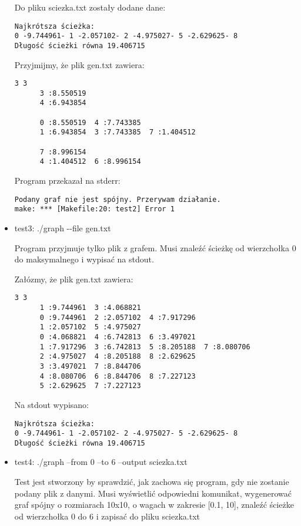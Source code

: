 \documentclass[]{article}
\begin{document}
\begin{itemize}
Do pliku sciezka.txt zostały dodane dane:
\begin{verbatim}
Najkrótsza ścieżka:
0 -9.744961- 1 -2.057102- 2 -4.975027- 5 -2.629625- 8
Długość ścieżki równa 19.406715
\end{verbatim}

Przyjmijmy, że plik gen.txt zawiera:
\begin{verbatim}
3 3
	  3 :8.550519
	  4 :6.943854

	  0 :8.550519  4 :7.743385
	  1 :6.943854  3 :7.743385  7 :1.404512

	  7 :8.996154
	  4 :1.404512  6 :8.996154

\end{verbatim}

Program przekazał na stderr:
\begin{verbatim}
Podany graf nie jest spójny. Przerywam działanie.
make: *** [Makefile:20: test2] Error 1
\end{verbatim}
\item test3: ./graph -{}-file gen.txt

Program przyjmuje tylko plik z grafem. Musi znaleźć ścieżkę od wierzchołka 0 do maksymalnego i wypisać na stdout.

Załózmy, że plik gen.txt zawiera:
\begin{verbatim}
3 3
	  1 :9.744961  3 :4.068821
	  0 :9.744961  2 :2.057102  4 :7.917296
	  1 :2.057102  5 :4.975027
	  0 :4.068821  4 :6.742813  6 :3.497021
	  1 :7.917296  3 :6.742813  5 :8.205188  7 :8.080706
	  2 :4.975027  4 :8.205188  8 :2.629625
	  3 :3.497021  7 :8.844706
	  4 :8.080706  6 :8.844706  8 :7.227123
	  5 :2.629625  7 :7.227123
\end{verbatim}
Na stdout wypisano:
\begin{verbatim}
Najkrótsza ścieżka: 
0 -9.744961- 1 -2.057102- 2 -4.975027- 5 -2.629625- 8
Długość ścieżki równa 19.406715
\end{verbatim}
\item test4: ./graph --from 0 --to 6 --output sciezka.txt

Test jest stworzony by sprawdzić, jak zachowa się program, gdy nie zostanie podany plik z danymi. Musi wyświetlić odpowiedni komunikat, wygenerować graf spójny o rozmiarach 10x10, o wagach w zakresie [0.1, 10], znaleźć ścieżke od wierzchołka 0 do 6 i zapisać do pliku sciezka.txt


\end{itemize}
\end{document}
